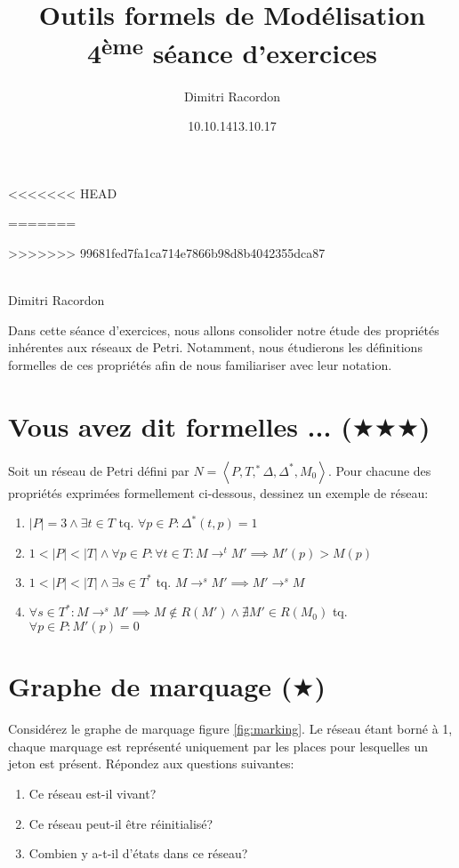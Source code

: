 \documentclass[a4paper, titlepage]{article}
\makeatletter
\numberwithin{figure}{section}
\numberwithin{table}{section}
\newcommand{\tuple}[1]{\ensuremath{\left \langle #1 \right \rangle }}
\newcommand{\card}[1]{\ensuremath{\left \vert #1 \right \vert }}
\newcommand\objective[1]{\def\@objective{#1}}
\newcommand{\makecustomtitle}{%
	\begin{center}
		\huge\@title \\
		[1ex]\small Dimitri Racordon \\ \@date
	\end{center}
	\@objective
}
\makeatother
\begin{document}
  \title{Outils formels de Modélisation \\ 4\textsuperscript{ème} séance d'exercices}
  \author{Dimitri Racordon}
<<<<<<< HEAD
  \date{10.10.14}
=======
  \date{13.10.17}
>>>>>>> 99681fed7fa1ca714e7866b98d8b4042355dca87
	\objective{Dans cette séance d'exercices, nous allons consolider notre étude des propriétés inhérentes aux réseaux de Petri. Notamment, nous étudierons les définitions formelles de ces propriétés afin de nous familiariser avec leur notation.}

	\makecustomtitle

\section{Vous avez dit formelles ... ($\bigstar\bigstar\bigstar$)}

Soit un réseau de Petri défini par $N=\tuple{P,T,^*\Delta,\Delta^*,M_0}$.
Pour chacune des propriétés exprimées formellement ci-dessous, dessinez un exemple de réseau:
\begin{enumerate}
	\item $|P|=3 \wedge \exists t \in T$ tq. $\forall p \in P: \Delta^*(t,p) = 1$
	\item $1 < \card{P} < \card{T} \wedge \forall p \in P: \forall t \in T: M \rightarrow^t M' \implies M'(p) > M(p)$
  \item $1 < \card{P} < \card{T} \wedge \exists s \in T^*$ tq. $M \rightarrow^s M' \implies M' \rightarrow^s M$
  \item $\forall s \in T^*: M \rightarrow^s M' \implies M \notin R(M') \wedge \nexists M' \in R(M_0)$ tq. $\forall p \in P: M'(p) = 0$
\end{enumerate}

\section{Graphe de marquage ($\bigstar$)}

Considérez le graphe de marquage figure \ref{fig:marking}.
Le réseau étant borné à 1,
chaque marquage est représenté uniquement par les places pour lesquelles un jeton est présent.
Répondez aux questions suivantes:
\begin{enumerate}
	\item Ce réseau est-il vivant?
	\item Ce réseau peut-il être réinitialisé?
	\item Combien y a-t-il d'états dans ce réseau?
\end{enumerate}
\end{document}
